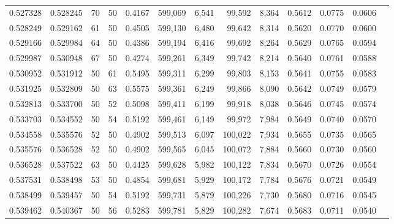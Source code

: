 \begin{tabular}{rrrrrrrrrrrrr}
0.527328 & 0.528245 &    70 &  50 &                                     0.4167 & 599,069 &   6,541 &  99,592 &   8,364 & 0.5612 & 0.0775 & 0.0606 \\
0.528249 & 0.529162 &    61 &  50 &                                     0.4505 & 599,130 &   6,480 &  99,642 &   8,314 & 0.5620 & 0.0770 & 0.0600 \\
0.529166 & 0.529984 &    64 &  50 &                                     0.4386 & 599,194 &   6,416 &  99,692 &   8,264 & 0.5629 & 0.0765 & 0.0594 \\
0.529987 & 0.530948 &    67 &  50 &                                     0.4274 & 599,261 &   6,349 &  99,742 &   8,214 & 0.5640 & 0.0761 & 0.0588 \\
0.530952 & 0.531912 &    50 &  61 &                                     0.5495 & 599,311 &   6,299 &  99,803 &   8,153 & 0.5641 & 0.0755 & 0.0583 \\
0.531925 & 0.532809 &    50 &  63 &                                     0.5575 & 599,361 &   6,249 &  99,866 &   8,090 & 0.5642 & 0.0749 & 0.0579 \\
0.532813 & 0.533700 &    50 &  52 &                                     0.5098 & 599,411 &   6,199 &  99,918 &   8,038 & 0.5646 & 0.0745 & 0.0574 \\
0.533703 & 0.534552 &    50 &  54 &                                     0.5192 & 599,461 &   6,149 &  99,972 &   7,984 & 0.5649 & 0.0740 & 0.0570 \\
0.534558 & 0.535576 &    52 &  50 &                                     0.4902 & 599,513 &   6,097 & 100,022 &   7,934 & 0.5655 & 0.0735 & 0.0565 \\
0.535576 & 0.536528 &    52 &  50 &                                     0.4902 & 599,565 &   6,045 & 100,072 &   7,884 & 0.5660 & 0.0730 & 0.0560 \\
0.536528 & 0.537522 &    63 &  50 &                                     0.4425 & 599,628 &   5,982 & 100,122 &   7,834 & 0.5670 & 0.0726 & 0.0554 \\
0.537531 & 0.538498 &    53 &  50 &                                     0.4854 & 599,681 &   5,929 & 100,172 &   7,784 & 0.5676 & 0.0721 & 0.0549 \\
0.538499 & 0.539457 &    50 &  54 &                                     0.5192 & 599,731 &   5,879 & 100,226 &   7,730 & 0.5680 & 0.0716 & 0.0545 \\
0.539462 & 0.540367 &    50 &  56 &                                     0.5283 & 599,781 &   5,829 & 100,282 &   7,674 & 0.5683 & 0.0711 & 0.0540 \\

\end{tabular}
